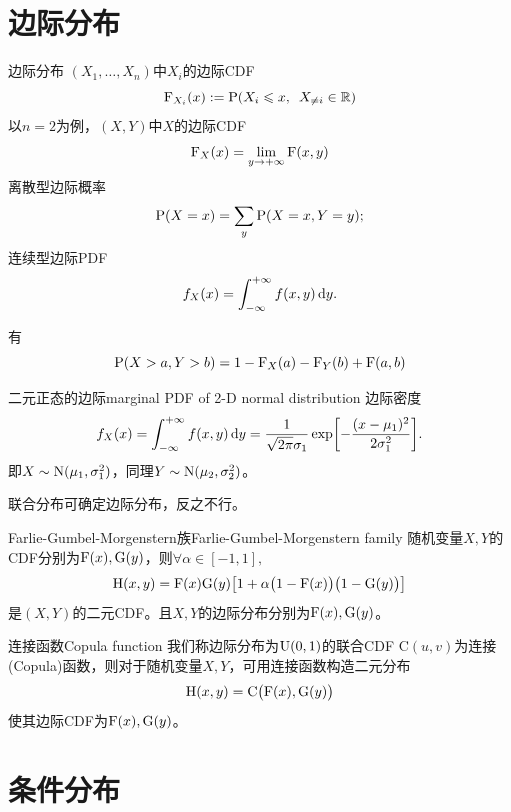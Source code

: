 \section{边际分布}

\begin{definition}{边际分布}{}
	$(X_1,\ldots,X_n)$中$X_i$的边际CDF
	\begin{equation}
		\CDF_{X_i}(x):=\P(X_i\leqslant x,\enspace X_{\neq i}\in\RR)
	\end{equation}
	以$n=2$为例，$(X,Y)$中$X$的边际CDF
	\[
		\CDF_X(x)=\lim_{y\to+\infty}\CDF(x,y)
	\]
	离散型边际概率
	\[
		\P(X=x)=\sum_y\P(X=x,Y=y);
	\]
	连续型边际PDF
	\[
		f_X(x)=\int\iti f(x,y)\d y.
	\]
\end{definition}

\begin{corollary}
	有 
	\[
		\P(X>a,Y>b)=1-\CDF_X(a)-\CDF_Y(b)+\CDF(a,b)
	\]
\end{corollary}

\begin{example}{二元正态的边际}{marginal PDF of 2-D normal distribution}
	边际密度
	\[
		f_X(x)=\int\iti f(x,y)\d y=\frac1{\sqrt{2\pi}\sigma_1}\exp\biggfkh{-\frac{(x-\mu_1)^2}{2\sigma_1^2}}.
	\]
	即$X\sim\Norm(\mu_1,\sigma_1^2)$，同理$Y\sim\Norm(\mu_2,\sigma_2^2)$。
\end{example}
\begin{remark}
	联合分布可确定边际分布，反之不行。
\end{remark}
\begin{example}{Farlie-Gumbel-Morgenstern族}{Farlie-Gumbel-Morgenstern family}
	随机变量$X,Y$的CDF分别为$\CDF(x),\mathrm G(y)$，则$\forall\alpha\in[-1,1],$
	\begin{equation}
		\mathrm H(x,y)=\CDF(x)\mathrm G(y)\bigfkh{1+\alpha\bigkh{1-\CDF(x)}\bigkh{1-\mathrm G(y)}}
	\end{equation}
	是$(X,Y)$的二元CDF。且$X,Y$的边际分布分别为$\CDF(x),\mathrm G(y)$。
\end{example}
\begin{example}{连接函数}{Copula function}
	我们称边际分布为$\Unif(0,1)$的联合CDF $\mathrm C(u,v)$为连接(Copula)函数，则对于随机变量$X,Y$，可用连接函数构造二元分布
	\begin{equation}
		\mathrm H(x,y)=\mathrm C\bigkh{\CDF(x),\mathrm G(y)}
	\end{equation}
	使其边际CDF为$\CDF(x),\mathrm G(y)$。
\end{example}

\section{条件分布}

